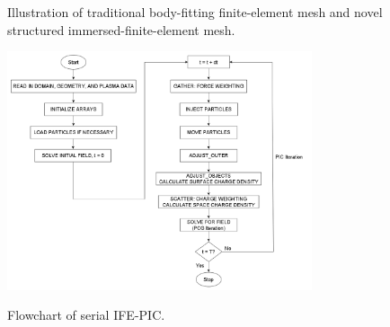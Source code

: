 \documentclass{siamart171218}
\begin{document}
\begin{figure}[ht!]
\centering
\begin{subfigmatrix}{2} %
%
%
\end{subfigmatrix}
\caption{Illustration of traditional body-fitting finite-element mesh and
novel structured immersed-finite-element mesh.}
\label{fig:ifepic:mesh}
\end{figure}

\begin{figure}[ht!]
\centering
{\includegraphics[width=0.8\textwidth]{flowchart_serial.png}}
\caption{Flowchart of serial IFE-PIC.}
\label{fig:flowchart:serial}
\end{figure}
\end{document}
